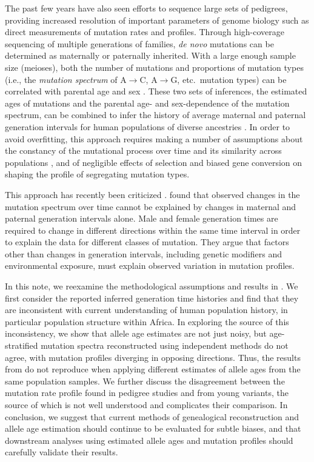 \documentclass[]{article}
\begin{document}
The past few years have also seen efforts to sequence large sets of pedigrees,
providing increased resolution of important parameters of genome biology such
as direct measurements of mutation rates and profiles. Through high-coverage
sequencing of multiple generations of families, \emph{de novo} mutations can be
determined as maternally or paternally inherited. With a large enough sample
size (meioses), both the number of mutations and proportions of mutation types
(i.e., the \emph{mutation spectrum} of A$\rightarrow$C, A$\rightarrow$G, etc.\
mutation types) can be correlated with parental age and sex
\citep{jonsson2017parental,halldorsson2019characterizing}. These two sets of
inferences, the estimated ages of mutations and the parental age- and
sex-dependence of the mutation spectrum, can be combined to infer the history
of average maternal and paternal generation intervals for human populations of
diverse ancestries \citep{macia2021different,wang2023human}. In order to avoid
overfitting, this approach requires making a number of assumptions about the
constancy of the mutational process over time and its similarity across
populations \citep{harris2015evidence,mathieson2017differences,harris2017rapid,
dewitt2021nonparametric}, and of negligible effects of selection and biased
gene conversion \citep{lachance2014biased,glemin2015quantification} on shaping
the profile of segregating mutation types.

This approach has recently been criticized \citep{gao2023limited}.
\citeauthor{gao2023limited} found that observed changes in the mutation
spectrum over time cannot be explained by changes in maternal and paternal
generation intervals alone. Male and female generation times are required to
change in different directions within the same time interval in order to
explain the data for different classes of mutation. They argue that factors
other than changes in generation intervals, including genetic modifiers and
environmental exposure, must explain observed variation in mutation profiles.


In this note, we reexamine the methodological assumptions and results in
\citet{wang2023human}. We first consider the reported inferred generation time
histories and find that they are inconsistent with current understanding of
human population history, in particular population structure within Africa. In
exploring the source of this inconsistency, we show that allele age estimates
are not just noisy, but age-stratified mutation spectra reconstructed using
independent methods do not agree, with mutation profiles diverging in opposing
directions. Thus, the results from \citet{wang2023human} do not reproduce
when applying different estimates of allele ages from the same population samples. We
further discuss the disagreement between the mutation rate profile found in
pedigree studies and from young variants, the source of which is not well
understood and complicates their comparison. In conclusion, we suggest that
current methods of genealogical reconstruction and allele age estimation
should continue to be evaluated for subtle biases, and that
downstream analyses using estimated allele ages and mutation profiles should
carefully validate their results.
\end{document}
